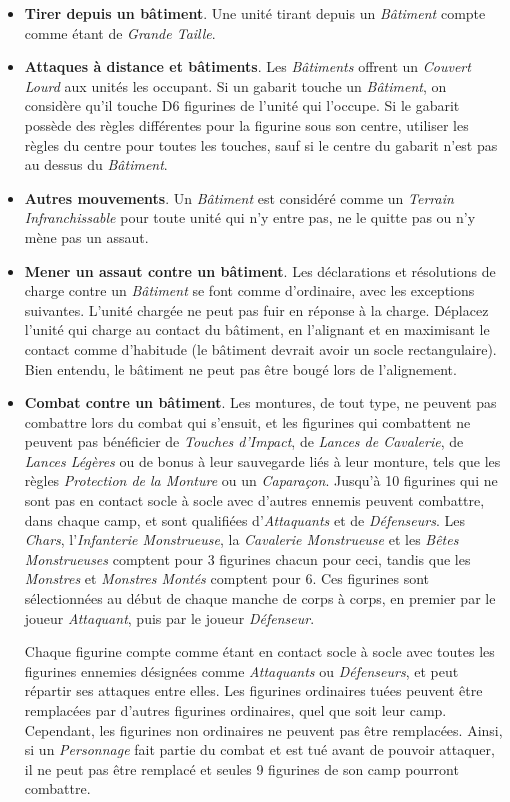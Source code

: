 \begin{itemize}[label={-}]
\item \textbf{Tirer depuis un bâtiment}. Une unité tirant depuis un \emph{Bâtiment} compte comme étant de \emph{Grande Taille}. 
\item \textbf{Attaques à distance et bâtiments}. Les \emph{Bâtiments} offrent un \emph{Couvert Lourd} aux unités les occupant. Si un gabarit touche un \emph{Bâtiment}, on considère qu'il touche D6 figurines de l'unité qui l'occupe. Si le gabarit possède des règles différentes pour la figurine sous son centre, utiliser les règles du centre pour toutes les touches, sauf si le centre du gabarit n'est pas au dessus du \emph{Bâtiment}.
\item \textbf{Autres mouvements}. Un \emph{Bâtiment} est considéré comme un \emph{Terrain Infranchissable} pour toute unité qui n'y entre pas, ne le quitte pas ou n'y mène pas un assaut.
\item \textbf{Mener un assaut contre un bâtiment}. Les déclarations et résolutions de charge contre un \emph{Bâtiment} se font comme d'ordinaire, avec les exceptions suivantes. L'unité chargée ne peut pas fuir en réponse à la charge. Déplacez l'unité qui charge au contact du bâtiment, en l'alignant et en maximisant le contact comme d'habitude (le bâtiment devrait avoir un socle rectangulaire). Bien entendu, le bâtiment ne peut pas être bougé lors de l'alignement.
\item \textbf{Combat contre un bâtiment}. Les montures, de tout type, ne peuvent pas combattre lors du combat qui s'ensuit, et les figurines qui combattent ne peuvent pas bénéficier de \emph{Touches d'Impact}, de \emph{Lances de Cavalerie}, de \emph{Lances Légères} ou de bonus à leur sauvegarde liés à leur monture, tels que les règles \emph{Protection de la Monture} ou un \emph{Caparaçon}. Jusqu'à 10 figurines qui ne sont pas en contact socle à socle avec d'autres ennemis peuvent combattre, dans chaque camp, et sont qualifiées d'\emph{Attaquants} et de \emph{Défenseurs}. Les \emph{Chars}, l'\emph{Infanterie Monstrueuse}, la \emph{Cavalerie Monstrueuse} et les \emph{Bêtes Monstrueuses} comptent pour 3 figurines chacun pour ceci, tandis que les \emph{Monstres} et \emph{Monstres Montés} comptent pour 6. Ces figurines sont sélectionnées au début de chaque manche de corps à corps, en premier par le joueur \emph{Attaquant}, puis par le joueur \emph{Défenseur}.

Chaque figurine compte comme étant en contact socle à socle avec toutes les figurines ennemies désignées comme \emph{Attaquants} ou \emph{Défenseurs}, et peut répartir ses attaques entre elles. Les figurines ordinaires tuées peuvent être remplacées par d'autres figurines ordinaires, quel que soit leur camp. Cependant, les figurines non ordinaires ne peuvent pas être remplacées. Ainsi, si un \emph{Personnage} fait partie du combat et est tué avant de pouvoir attaquer, il ne peut pas être remplacé et seules 9 figurines de son camp pourront combattre.


\end{itemize}
